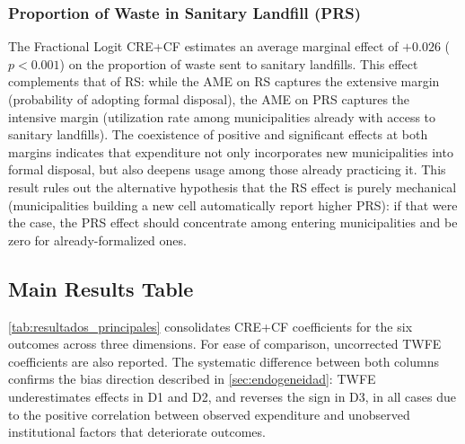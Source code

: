 \subsubsection*{Proportion of Waste in Sanitary Landfill (PRS)}

The Fractional Logit CRE+CF \citep{PapkeWooldridge1996} estimates an average marginal effect of $+0.026$ ($p < 0.001$) on the proportion of waste sent to sanitary landfills. This effect complements that of RS: while the AME on RS captures the extensive margin (probability of adopting formal disposal), the AME on PRS captures the intensive margin (utilization rate among municipalities already with access to sanitary landfills). The coexistence of positive and significant effects at both margins indicates that expenditure not only incorporates new municipalities into formal disposal, but also deepens usage among those already practicing it. This result rules out the alternative hypothesis that the RS effect is purely mechanical (municipalities building a new cell automatically report higher PRS): if that were the case, the PRS effect should concentrate among entering municipalities and be zero for already-formalized ones.

\subsection{Main Results Table}
\label{sec:tabla_principal}

\cref{tab:resultados_principales} consolidates CRE+CF coefficients for the six outcomes across three dimensions. For ease of comparison, uncorrected TWFE coefficients are also reported. The systematic difference between both columns confirms the bias direction described in \cref{sec:endogeneidad}: TWFE underestimates effects in D1 and D2, and reverses the sign in D3, in all cases due to the positive correlation between observed expenditure and unobserved institutional factors that deteriorate outcomes.

